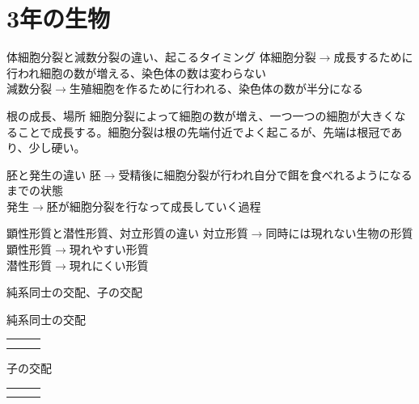 \documentclass[10pt,dvipdfmx]{jsarticle}
\newcommand{\answer}[2]{{\color{orange}#2}}
\newcommand{\answer}[2]{\vspace{#1mm}}
\begin{document}
\section{3年の生物}
\begin{itembox}[l]{体細胞分裂と減数分裂の違い、起こるタイミング}
	\answer{10}{
		体細胞分裂$\rightarrow$成長するために行われ細胞の数が増える、染色体の数は変わらない\\
		減数分裂$\rightarrow$生殖細胞を作るために行われる、染色体の数が半分になる
	}
\end{itembox}

\begin{itembox}[l]{根の成長、場所}
	\answer{10}{細胞分裂によって細胞の数が増え、一つ一つの細胞が大きくなることで成長する。細胞分裂は根の先端付近でよく起こるが、先端は根冠であり、少し硬い。}
\end{itembox}

\begin{itembox}[l]{胚と発生の違い}
	\answer{10}{
		胚$\rightarrow$受精後に細胞分裂が行われ自分で餌を食べれるようになるまでの状態\\
		発生$\rightarrow$胚が細胞分裂を行なって成長していく過程
	}
\end{itembox}

\begin{itembox}[l]{顕性形質と潜性形質、対立形質の違い}
	\answer{10}{
		対立形質$\rightarrow$同時には現れない生物の形質\\
		顕性形質$\rightarrow$現れやすい形質\\
		潜性形質$\rightarrow$現れにくい形質
	}
\end{itembox}

\begin{itembox}[l]{純系同士の交配、子の交配}
	\begin{multicols}{2}
		\begin{minipage}{0.5\textwidth}
			純系同士の交配\\
			{\renewcommand\arraystretch{2}
			\begin{tabular}[h]{p{1cm}|p{1.5cm}|p{1.5cm}|}
				 &  & \\
				\hline
				 &  & \\
				\hline
				 &  & \\
				\hline
			\end{tabular}
			}
		\end{minipage}
		\begin{minipage}{0.5\textwidth}
			子の交配\\
			{\renewcommand\arraystretch{2}
			\begin{tabular}[h]{p{1cm}|p{1.5cm}|p{1.5cm}|}
				 &  & \\
				\hline
				 &  & \\
				\hline
				 &  & \\
				\hline
			\end{tabular}
			}
		\end{minipage}
	\end{multicols}
\end{itembox}
\end{document}
